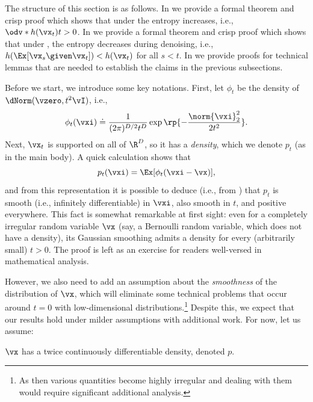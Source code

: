 \documentclass[../../book-main.tex]{subfiles}
\begin{document}
The structure of this section is as follows. In
 we provide a formal theorem
and crisp proof which shows that under
 the entropy increases,
i.e., \(\odv*{h(\vx_{t})}{t} > 0\). In
 we provide a formal theorem
and crisp proof which shows that under
, the entropy decreases
during denoising, i.e., \(h(\Ex[\vx_{s} \given \vx_{t}]) <
h(\vx_{t})\) for all \(s < t\). In
 we provide proofs for
technical lemmas that are needed to establish the claims in the
previous subsections.

Before we start, we introduce some key notations. First, let
\(\phi_{t}\) be the density of \(\dNorm(\vzero, t^{2}\vI)\), i.e.,
\begin{equation}\label{eq:gaussian_noise_time_t}
    \phi_{t}(\vxi) \doteq
    \frac{1}{(2\pi)^{D/2}t^{D}}\exp\rp{-\frac{\norm{\vxi}_{2}^{2}}{2t^{2}}}.
\end{equation}
Next, \(\vx_{t}\) is supported on all of \(\R^{D}\), so it has a
\textit{density}, which we denote \(p_{t}\) (as in the main body). A
quick calculation shows that
\begin{equation}\label{eq:p_t_representation}
    p_{t}(\vxi) = \Ex[\phi_{t}(\vxi - \vx)],
\end{equation}
and from this representation it is possible to deduce (i.e., from
) that \(p_{t}\) is smooth (i.e.,
infinitely differentiable) in \(\vxi\), also smooth in \(t\), and
positive everywhere. This fact is somewhat remarkable at first sight:
even for a completely irregular random variable \(\vx\) (say, a
Bernoulli random variable, which does not have a density), its
Gaussian smoothing admits a density for every (arbitrarily small) \(t
> 0\). The proof is left as an exercise for readers well-versed in
mathematical analysis.

However, we also need to add an assumption about the
\textit{smoothness} of the distribution of \(\vx\), which will
eliminate some technical problems that occur around \(t = 0\) with
low-dimensional distributions.\footnote{As then various quantities
    become highly irregular and dealing with them would require
significant additional analysis.} Despite this, we expect that our
results hold under milder assumptions with additional work. For now,
let us assume:
\begin{assumption}\label{assumption:entropy_x_density}
    \(\vx\) has a twice continuously differentiable density, denoted \(p\).
\end{assumption}
\end{document}
